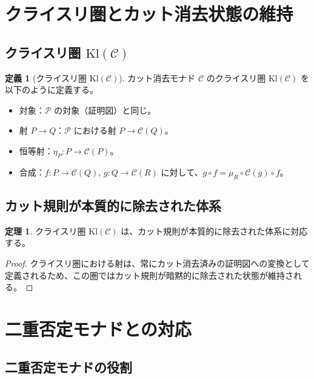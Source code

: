 \documentclass[11pt,a4paper]{article}
\theoremstyle{definition}
\newtheorem{definition}{定義}[section]
\newtheorem{theorem}{定理}[section]
\newcommand{\monad}{\mathcal{C}}
\newcommand{\proofs}{\mathcal{P}}
\newcommand{\kleisli}{\mathrm{Kl}}
\begin{document}
\section{クライスリ圏とカット消去状態の維持}

\subsection{クライスリ圏 $\kleisli(\monad)$}

\begin{definition}[クライスリ圏 $\kleisli(\monad)$]
カット消去モナド $\monad$ のクライスリ圏 $\kleisli(\monad)$ を以下のように定義する。
\begin{itemize}
  \item 対象：$\proofs$ の対象（証明図）と同じ。
  \item 射 $P \to Q$：$\proofs$ における射 $P \to \monad(Q)$。
  \item 恒等射：$\eta_P : P \to \monad(P)$。
  \item 合成：$f : P \to \monad(Q)$, $g : Q \to \monad(R)$ に対して、$g \circ f = \mu_R \circ \monad(g) \circ f$。
\end{itemize}
\end{definition}

\subsection{カット規則が本質的に除去された体系}

\begin{theorem}
クライスリ圏 $\kleisli(\monad)$ は、カット規則が本質的に除去された体系に対応する。
\end{theorem}

\begin{proof}
クライスリ圏における射は、常にカット消去済みの証明図への変換として定義されるため、この圏ではカット規則が暗黙的に除去された状態が維持される。
\end{proof}

\section{二重否定モナドとの対応}

\subsection{二重否定モナドの役割}
\end{document}

